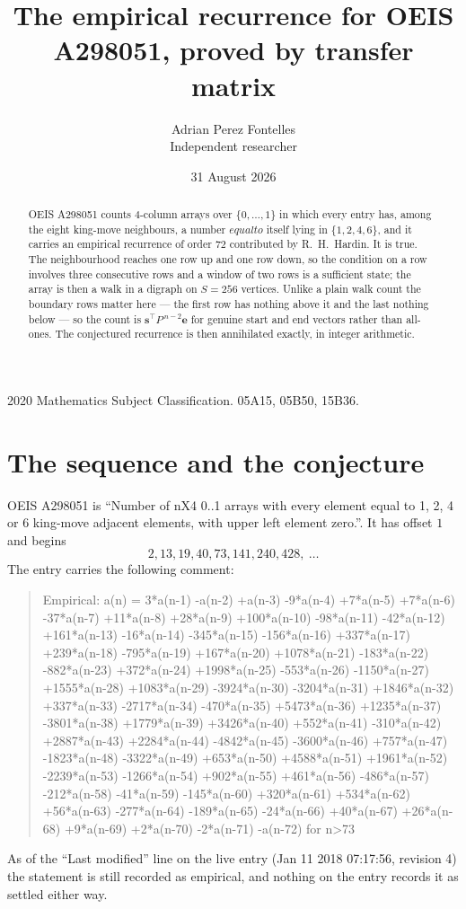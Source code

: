 \documentclass[11pt,a4paper]{article}
\title{The empirical recurrence for OEIS A298051, proved by transfer matrix}
\author{Adrian Perez Fontelles\\ \small Independent researcher}
\date{31 August 2026}
\theoremstyle{plain}
\theoremstyle{definition}
\begin{document}
\maketitle

\begin{abstract}
OEIS A298051 counts $4$-column arrays over $\{0,\dots,1\}$ in which every entry has,
among the eight king-move neighbours, a number $equal to$ itself lying in $\{1,2,4,6\}$, and it carries an empirical
recurrence of order $72$ contributed by R.~H.~Hardin. It is true. The neighbourhood
reaches one row up and one row down, so the condition on a row involves three consecutive
rows and a window of two rows is a sufficient state; the array is then a walk in a digraph
on $S=256$ vertices. Unlike a plain walk count the boundary rows matter here --- the first
row has nothing above it and the last nothing below --- so the count is
$\mathbf{s}^{\!\top}P^{\,n-2}\mathbf{e}$ for genuine start and end vectors rather than
all-ones. The conjectured recurrence is then annihilated exactly, in integer arithmetic.
\end{abstract}

\noindent\small 2020 Mathematics Subject Classification. 05A15, 05B50, 15B36.\normalsize

\section{The sequence and the conjecture}

OEIS A298051 is ``Number of nX4 0..1 arrays with every element equal to 1, 2, 4 or 6 king-move adjacent elements, with upper left element zero.''. It has offset
$1$ and begins
\[
2, 13, 19, 40, 73, 141, 240, 428,\ \dots
\]
The entry carries the following comment:
\begin{quote}\small
Empirical: a(n) = 3*a(n-1) -a(n-2) +a(n-3) -9*a(n-4) +7*a(n-5) +7*a(n-6) -37*a(n-7) +11*a(n-8) +28*a(n-9) +100*a(n-10) -98*a(n-11) -42*a(n-12) +161*a(n-13) -16*a(n-14) -345*a(n-15) -156*a(n-16) +337*a(n-17) +239*a(n-18) -795*a(n-19) +167*a(n-20) +1078*a(n-21) -183*a(n-22) -882*a(n-23) +372*a(n-24) +1998*a(n-25) -553*a(n-26) -1150*a(n-27) +1555*a(n-28) +1083*a(n-29) -3924*a(n-30) -3204*a(n-31) +1846*a(n-32) +337*a(n-33) -2717*a(n-34) -470*a(n-35) +5473*a(n-36) +1235*a(n-37) -3801*a(n-38) +1779*a(n-39) +3426*a(n-40) +552*a(n-41) -310*a(n-42) +2887*a(n-43) +2284*a(n-44) -4842*a(n-45) -3600*a(n-46) +757*a(n-47) -1823*a(n-48) -3322*a(n-49) +653*a(n-50) +4588*a(n-51) +1961*a(n-52) -2239*a(n-53) -1266*a(n-54) +902*a(n-55) +461*a(n-56) -486*a(n-57) -212*a(n-58) -41*a(n-59) -145*a(n-60) +320*a(n-61) +534*a(n-62) +56*a(n-63) -277*a(n-64) -189*a(n-65) -24*a(n-66) +40*a(n-67) +26*a(n-68) +9*a(n-69) +2*a(n-70) -2*a(n-71) -a(n-72) for n>73
\end{quote}
As of the ``Last modified'' line on the live entry (Jan 11 2018 07:17:56, revision
4) the statement is still recorded as empirical, and nothing on the entry
records it as settled either way.
\end{document}
